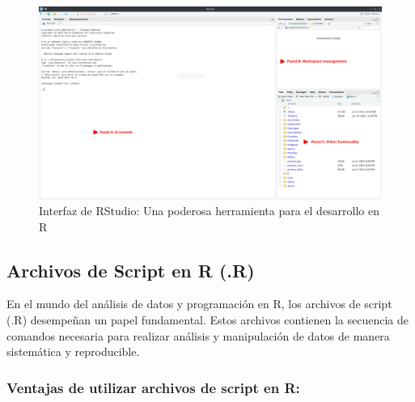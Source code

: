 \documentclass[
  letterpaper,
  DIV=11,
  numbers=noendperiod]{scrartcl}
\begin{document}
\begin{figure}

\caption{Interfaz de RStudio: Una poderosa herramienta para el
desarrollo en R}

{\centering \includegraphics{images/Screenshot_20230610_233058.png}

}

\end{figure}

\hypertarget{archivos-de-script-en-r-.r}{%
\subsection{Archivos de Script en R
(.R)}\label{archivos-de-script-en-r-.r}}

En el mundo del análisis de datos y programación en R, los archivos de
script (.R) desempeñan un papel fundamental. Estos archivos contienen la
secuencia de comandos necesaria para realizar análisis y manipulación de
datos de manera sistemática y reproducible.

\hypertarget{ventajas-de-utilizar-archivos-de-script-en-r}{%
\subsubsection{Ventajas de utilizar archivos de script en
R:}\label{ventajas-de-utilizar-archivos-de-script-en-r}}
\end{document}
